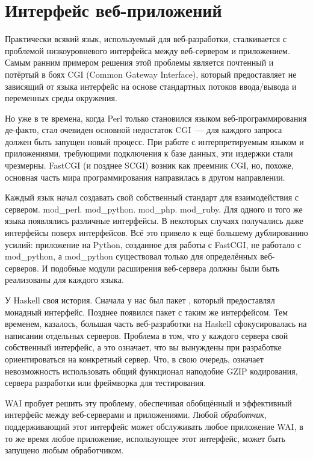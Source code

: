\chapter{Интерфейс веб-приложений}\label{chap:web_application_interface}

Практически всякий язык, используемый для веб-разработки, сталкивается с проблемой
низкоуровневого интерфейса между веб-сервером и приложением. Самым ранним примером
решения этой проблемы является почтенный и потёртый в боях CGI (Common Gateway Interface),
который предоставляет не зависящий от языка интерфейс на основе стандартных потоков ввода/вывода и переменных среды окружения.

Но уже в те времена, когда Perl только становился языком веб-программирования де-факто, стал очевиден основной недостаток CGI~--- для каждого запроса должен быть запущен новый процесс. При работе с интерпретируемым языком и приложениями, требующими подключения к базе
данных, эти издержки стали чрезмерны. FastCGI (и позднее SCGI) возник как преемник
CGI, но, похоже, основная часть мира программирования направилась в другом направлении.

Каждый язык начал создавать свой собственный стандарт для взаимодействия с сервером.
mod\_perl. mod\_python. mod\_php. mod\_ruby. Для одного и того же языка появлялись различные
интерфейсы. В некоторых случаях получались даже интерфейсы поверх интерфейсов.
Всё это привело к ещё большему дублированию усилий: приложение на Python, созданное
для работы с FastCGI, не работало с mod\_python, а mod\_python существовал только для
определённых веб-серверов. И подобные модули расширения веб-сервера должны были быть реализованы для каждого языка.

У Haskell своя история. Сначала у нас был пакет ,
который предоставлял монадный интерфейс. Позднее появился пакет  с таким же интерфейсом.
Тем временем, казалось, большая часть
веб-разработки на Haskell сфокусировалась на написании отдельных серверов.
Проблема в том, что у каждого сервера свой собственный интерфейс, а это означает, что
вы вынуждены при разработке ориентироваться на конкретный сервер. Что, в свою очередь,
означает невозможность использовать общий функционал наподобие
GZIP кодирования, сервера разработки или фреймворка для тестирования.

WAI пробует решить эту проблему, обеспечивая обобщённый и эффективный интерфейс между
веб-серверами и приложениями. Любой \emph{обработчик}, поддерживающий этот интерфейс может обслуживать
любое приложение WAI, в то же время любое приложение, использующее этот интерфейс, может быть запущено любым обработчиком.

